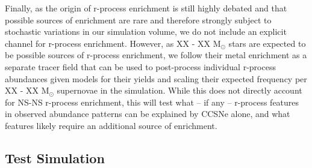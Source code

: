 \documentclass[12pt]{article} %
\begin{document}
Finally, as the origin of r-process enrichment is still highly debated and that possible sources of enrichment are rare and therefore strongly subject to stochastic variations in our simulation volume, we do not include an explicit channel for r-process enrichment. However, as XX - XX M$_{\odot}$ stars are expected to be possible sources of r-process enrichment, we follow their metal enrichment as a separate tracer field that can be used to post-process individual r-process abundances given models for their yields and scaling their expected frequency per XX - XX M$_{\odot}$ supernovae in the simulation. While this does not directly account for NS-NS r-process enrichment, this will test what -- if any -- r-process features in observed abundance patterns can be explained by CCSNe alone, and what features likely require an additional source of enrichment.

\subsection{Test Simulation}
\end{document}
